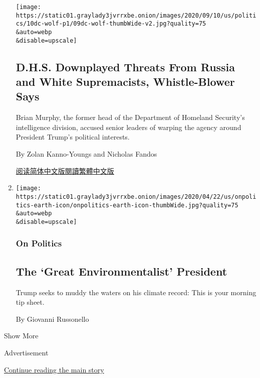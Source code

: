 \begin{enumerate}
  \texttt{[image: https://static01.graylady3jvrrxbe.onion/images/2020/09/10/us/politics/10dc-wolf-p1/09dc-wolf-thumbWide-v2.jpg?quality=75\\\&auto=webp\\\&disable=upscale]}

  \hypertarget{dhs-downplayed-threats-from-russia-and-white-supremacists-whistle-blower-says}{%
  \subsection{D.H.S. Downplayed Threats From Russia and White
  Supremacists, Whistle-Blower
  Says}\label{dhs-downplayed-threats-from-russia-and-white-supremacists-whistle-blower-says}}

  Brian Murphy, the former head of the Department of Homeland Security's
  intelligence division, accused senior leaders of warping the agency
  around President Trump's political interests.

  By Zolan Kanno-Youngs and Nicholas Fandos

  \href{https://cn.nytimes3xbfgragh.onion/usa/20200910/homeland-security-russia-trump/}{阅读简体中文版}\href{https://cn.nytimes3xbfgragh.onion/usa/20200910/homeland-security-russia-trump/zh-hant/}{閱讀繁體中文版}
\item
  \href{/2020/09/09/us/politics/trump-climate-florida.html}{}

  \texttt{[image: https://static01.graylady3jvrrxbe.onion/images/2020/04/22/us/onpolitics-earth-icon/onpolitics-earth-icon-thumbWide.jpg?quality=75\\\&auto=webp\\\&disable=upscale]}

  \hypertarget{on-politics-1}{%
  \subsubsection{On Politics}\label{on-politics-1}}

  \hypertarget{the-great-environmentalist-president}{%
  \subsection{The `Great Environmentalist'
  President}\label{the-great-environmentalist-president}}

  Trump seeks to muddy the waters on his climate record: This is your
  morning tip sheet.

  By Giovanni Russonello
\end{enumerate}

Show More

Advertisement

\protect\hyperlink{after-mid5}{Continue reading the main story}

